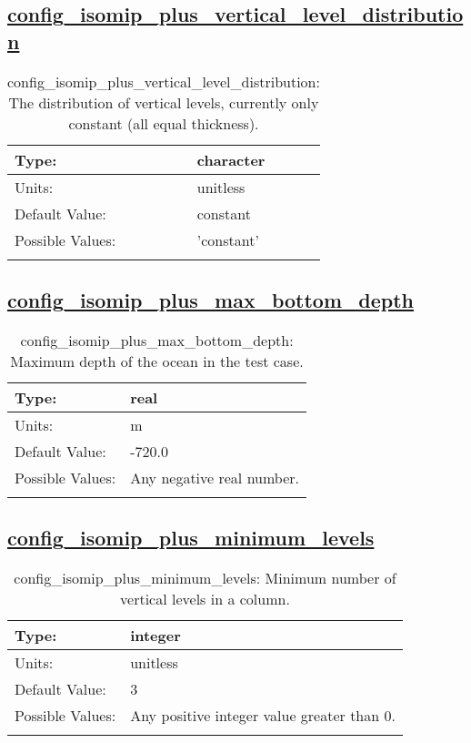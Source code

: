 \subsection[config\_isomip\_plus\_vertical\_level\_distribution]{\hyperref[sec:nm_tab_isomip_plus]{config\_isomip\_plus\_vertical\_level\_distribution}}
\label{subsec:nm_sec_config_isomip_plus_vertical_level_distribution}
\begin{center}
\begin{longtable}{| p{2.0in} || p{4.0in} |}
    \hline
    Type: & character \\
    \hline
    Units: & \si{unitless} \\
    \hline
    Default Value: & constant \\
    \hline
    Possible Values: & 'constant' \\
    \hline
    \caption{config\_isomip\_plus\_vertical\_level\_distribution: The distribution of vertical levels, currently only constant (all equal thickness).}
\end{longtable}
\end{center}
\subsection[config\_isomip\_plus\_max\_bottom\_depth]{\hyperref[sec:nm_tab_isomip_plus]{config\_isomip\_plus\_max\_bottom\_depth}}
\label{subsec:nm_sec_config_isomip_plus_max_bottom_depth}
\begin{center}
\begin{longtable}{| p{2.0in} || p{4.0in} |}
    \hline
    Type: & real \\
    \hline
    Units: & \si{m} \\
    \hline
    Default Value: & -720.0 \\
    \hline
    Possible Values: & Any negative real number. \\
    \hline
    \caption{config\_isomip\_plus\_max\_bottom\_depth: Maximum depth of the ocean in the test case.}
\end{longtable}
\end{center}
\subsection[config\_isomip\_plus\_minimum\_levels]{\hyperref[sec:nm_tab_isomip_plus]{config\_isomip\_plus\_minimum\_levels}}
\label{subsec:nm_sec_config_isomip_plus_minimum_levels}
\begin{center}
\begin{longtable}{| p{2.0in} || p{4.0in} |}
    \hline
    Type: & integer \\
    \hline
    Units: & \si{unitless} \\
    \hline
    Default Value: & 3 \\
    \hline
    Possible Values: & Any positive integer value greater than 0. \\
    \hline
    \caption{config\_isomip\_plus\_minimum\_levels: Minimum number of vertical levels in a column.}
\end{longtable}
\end{center}
